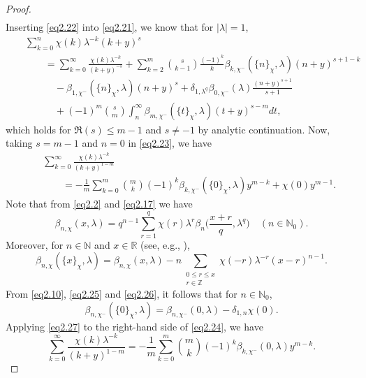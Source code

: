 \documentclass[reqno]{amsart}
\numberwithin{equation}{section}
\begin{document}
\begin{proof}
\begin{eqnarray}
\end{eqnarray}
Inserting \eqref{eq2.22} into \eqref{eq2.21}, we know that for $|\lambda|=1$,
\begin{eqnarray}\label{eq2.23}
&&\sum_{k=0}^{n}\chi(k)\lambda^{-k}(k+y)^{s}\nonumber\\
&&\qquad=\sum_{k=0}^{\infty}\frac{\chi(k)\lambda^{-k}}{(k+y)^{-s}}+\sum_{k=2}^{m}\binom{s}{k-1}\frac{(-1)^{k}}{k}\beta_{k,\chi^{-}}(\{n\}_{\chi},\lambda)(n+y)^{s+1-k}\nonumber\\
&&\qquad\quad-\beta_{1,\chi^{-}}(\{n\}_{\chi},\lambda)(n+y)^{s}+\delta_{1,\lambda^{q}}\beta_{0,\chi^{-}}(\lambda)\frac{(n+y)^{s+1}}{s+1}\nonumber\\
&&\qquad\quad+(-1)^{m}\binom{s}{m}\int_{n}^{\infty}\beta_{m,\chi^{-}}(\{t\}_{\chi},\lambda)(t+y)^{s-m}dt,
\end{eqnarray}
which holds for $\Re(s)\leqslant m-1$ and $s\neq-1$ by analytic continuation. Now, taking $s=m-1$ and $n=0$ in \eqref{eq2.23}, we have
\begin{eqnarray}\label{eq2.24}
&&\sum_{k=0}^{\infty}\frac{\chi(k)\lambda^{-k}}{(k+y)^{1-m}}\nonumber\\
&&\qquad=-\frac{1}{m}\sum_{k=0}^{m}\binom{m}{k}(-1)^{k}\beta_{k,\chi^{-}}(\{0\}_{\chi},\lambda)y^{m-k}+\chi(0)y^{m-1}.
\end{eqnarray}
Note that from \eqref{eq2.2} and \eqref{eq2.17} we have
\begin{equation}\label{eq2.25}
\beta_{n,\chi}(x,\lambda)=q^{n-1}\sum_{r=1}^{q}\chi(r)\lambda^{r}\beta_{n}\biggl(\frac{x+r}{q},\lambda^{q}\biggl)\quad(n\in\mathbb{N}_{0}).
\end{equation}
Moreover, for $n\in\mathbb{N}$ and $x\in\mathbb{R}$ (see, e.g., \cite[Propostion 2.8]{he}),
\begin{equation}\label{eq2.26}
\beta_{n,\chi}(\{x\}_{\chi},\lambda)=\beta_{n,\chi}(x,\lambda)-n\underset{\substack{0\leqslant r\leqslant x\\ r\in\mathbb{Z}}}{\sum}\chi(-r)\lambda^{-r}(x-r)^{n-1}.
\end{equation}
From \eqref{eq2.10}, \eqref{eq2.25} and \eqref{eq2.26}, it follows that for $n\in\mathbb{N}_{0}$,
\begin{equation}\label{eq2.27}
\beta_{n,\chi^{-}}(\{0\}_{\chi},\lambda)=\beta_{n,\chi^{-}}(0,\lambda)-\delta_{1,n}\chi(0).
\end{equation}
Applying \eqref{eq2.27} to the right-hand side of \eqref{eq2.24}, we have
\begin{equation}\label{eq2.28}
\sum_{k=0}^{\infty}\frac{\chi(k)\lambda^{-k}}{(k+y)^{1-m}}=-\frac{1}{m}\sum_{k=0}^{m}\binom{m}{k}(-1)^{k}\beta_{k,\chi^{-}}(0,\lambda)y^{m-k}.

\end{equation}
\end{proof}
\end{document}
